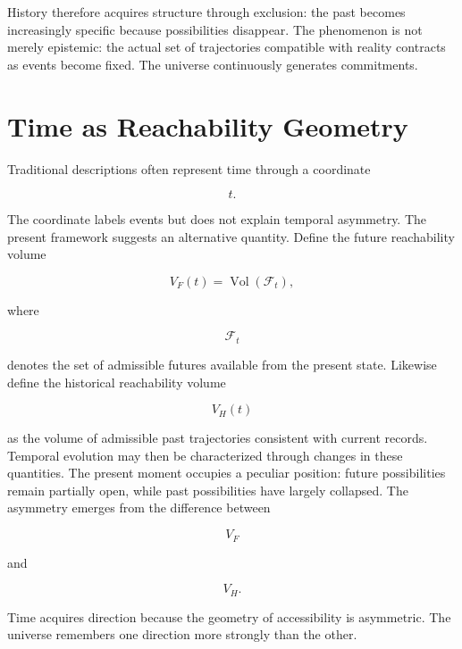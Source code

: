 \documentclass[11pt,oneside]{book}
\theoremstyle{plain}
\theoremstyle{definition}
\theoremstyle{remark}
\DeclareMathOperator{\Vol}{Vol}
\begin{document}
History therefore acquires structure through exclusion: the past becomes increasingly specific because possibilities disappear. The phenomenon is not merely epistemic: the actual set of trajectories compatible with reality contracts as events become fixed. The universe continuously generates commitments.

\section{Time as Reachability Geometry}

Traditional descriptions often represent time through a coordinate

\begin{equation}
t.
\end{equation}

The coordinate labels events but does not explain temporal asymmetry. The present framework suggests an alternative quantity. Define the future reachability volume

\begin{equation}
V_F(t)
=
\Vol(\mathcal{F}_t),
\end{equation}

where

\begin{equation}
\mathcal{F}_t
\end{equation}

denotes the set of admissible futures available from the present state. Likewise define the historical reachability volume

\begin{equation}
V_H(t)
\end{equation}

as the volume of admissible past trajectories consistent with current records. Temporal evolution may then be characterized through changes in these quantities. The present moment occupies a peculiar position: future possibilities remain partially open, while past possibilities have largely collapsed. The asymmetry emerges from the difference between

\begin{equation}
V_F
\end{equation}

and

\begin{equation}
V_H.
\end{equation}

Time acquires direction because the geometry of accessibility is asymmetric. The universe remembers one direction more strongly than the other.
\end{document}
